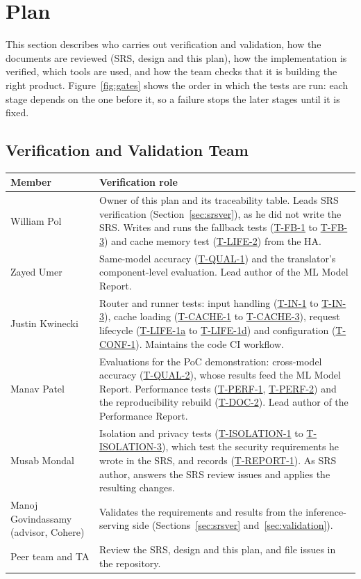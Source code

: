 \documentclass[12pt, titlepage]{article}
\newcommand{\tref}[1]{\hyperref[test:#1]{#1}}
\begin{document}
\section{Plan}
\label{sec:plan}

This section describes who carries out verification and validation, how the
documents are reviewed (SRS, design and this plan), how the implementation
is verified, which tools are used, and how the team checks that it is
building the right product.
Figure~\ref{fig:gates} shows the order in which the tests are run: each
stage depends on the one before it, so a failure stops the later stages
until it is fixed.

\subsection{Verification and Validation Team}

\noindent\begin{minipage}{\textwidth}
\begin{tabularx}{\textwidth}{lX}
\toprule
\textbf{Member} & \textbf{Verification role}\\
\midrule
William Pol & Owner of this plan and its traceability table. Leads SRS
verification (Section~\ref{sec:srsver}), as he did not write the SRS.
Writes and runs the fallback tests (\tref{T-FB-1} to \tref{T-FB-3}) and
cache memory test (\tref{T-LIFE-2}) from the HA.\\
Zayed Umer & Same-model accuracy (\tref{T-QUAL-1}) and the translator's
component-level evaluation. Lead author of the ML Model Report.\\
Justin Kwinecki & Router and runner tests: input handling (\tref{T-IN-1} to
\tref{T-IN-3}), cache loading (\tref{T-CACHE-1} to \tref{T-CACHE-3}),
request lifecycle (\tref{T-LIFE-1a} to \tref{T-LIFE-1d}) and configuration
(\tref{T-CONF-1}). Maintains the code CI workflow.\\
Manav Patel & Evaluations for the PoC demonstration: cross-model accuracy
(\tref{T-QUAL-2}), whose results feed the ML Model Report. Performance tests
(\tref{T-PERF-1}, \tref{T-PERF-2}) and the reproducibility rebuild
(\tref{T-DOC-2}). Lead author of the Performance Report.\\
Musab Mondal & Isolation and privacy tests (\tref{T-ISOLATION-1} to
\tref{T-ISOLATION-3}), which test the security requirements he wrote in the
SRS, and records (\tref{T-REPORT-1}). As SRS author, answers the SRS review
issues and applies the resulting changes.\\
Manoj Govindassamy (advisor, Cohere) & Validates the requirements and
results from the inference-serving side (Sections~\ref{sec:srsver}
and~\ref{sec:validation}).\\
Peer team and TA & Review the SRS, design and this plan, and file issues in
the repository.\\
\bottomrule
\end{tabularx}
\end{minipage}
\end{document}

